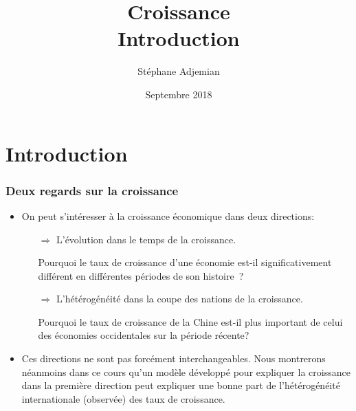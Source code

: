 \documentclass[10pt]{beamer}
\begin{document}
\title{Croissance\\\small{Introduction}}
\author[S. Adjemian]{St\'ephane Adjemian}
\date{Septembre 2018}

\begin{frame}
  \titlepage{}
\end{frame}

\section{Introduction}

\begin{frame}
  \frametitle{Deux regards sur la croissance}
  \begin{itemize}

  \item On peut s'intéresser à la croissance économique dans
    deux directions:

    \begin{itemize}

      \item[$\Rightarrow$] L'évolution dans le temps de la croissance.\newline

      Pourquoi le taux de croissance d'une économie est-il significativement différent en différentes périodes de son histoire ?\newline

      \item[$\Rightarrow$] L'hétérogénéité dans la coupe des nations de la croissance.\newline

      Pourquoi le taux de croissance de la Chine est-il plus important de celui des économies occidentales sur la période récente?

    \end{itemize}

    \bigskip

  \item Ces directions ne sont pas forcément interchangeables. Nous
    montrerons néanmoins dans ce cours qu'un modèle développé pour expliquer la
    croissance dans la première direction peut expliquer une bonne
    part de l'hétérogénéité internationale (observée) des taux de
    croissance.

  \end{itemize}

\end{frame}
\end{document}
